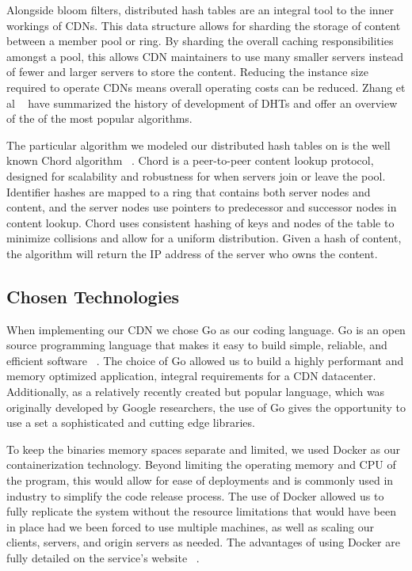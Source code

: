 \documentclass[conference]{IEEEtran}
\begin{document}
Alongside bloom filters, distributed hash tables are an integral tool to the inner workings of CDNs.  This data structure allows for sharding the storage of content between a member pool or ring.  By sharding the overall caching responsibilities amongst a pool, this allows CDN maintainers to use many smaller servers instead of fewer and larger servers to store the content.  Reducing the instance size required to operate CDNs means overall operating costs can be reduced. Zhang et al ~\cite{ZhangDHT} have summarized the history of development of DHTs and offer an overview of the of the most popular algorithms. 

The particular algorithm we modeled our distributed hash tables on is the well known Chord algorithm ~\cite{StoicaChord}. Chord is a peer-to-peer content lookup protocol, designed for scalability and robustness for when servers join or leave the pool. Identifier hashes are mapped to a ring that contains both server nodes and content, and the server nodes use pointers to predecessor and successor nodes in content lookup. Chord uses consistent hashing of keys and nodes of the table to minimize collisions and allow for a uniform distribution. Given a hash of content, the algorithm will return the IP address of the server who owns the content. 

\subsection*{Chosen Technologies}
When implementing our CDN we chose Go as our coding language.  Go is an open source programming language that makes it easy to build simple, reliable, and efficient software ~\cite{go}.  The choice of Go allowed us to build a highly performant and memory optimized application, integral requirements for a CDN datacenter. Additionally, as a relatively recently created but popular language, which was originally developed by Google researchers, the use of Go gives the opportunity to use a set a sophisticated and cutting edge libraries.

To keep the binaries memory spaces separate and limited, we used Docker as our containerization technology.  Beyond limiting the operating memory and CPU of the program, this would allow for ease of deployments and is commonly used in industry to simplify the code release process. The use of Docker allowed us to fully replicate the system without the resource limitations that would have been in place had we been forced to use multiple machines, as well as scaling our clients, servers, and origin servers as needed. The advantages of using Docker are fully detailed on the service’s website ~\cite{docker}. 
\end{document}
